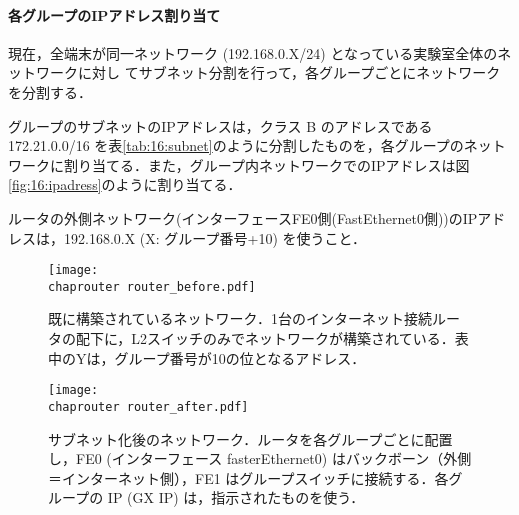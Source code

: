 \paragraph{各グループのIPアドレス割り当て}

現在，全端末が同一ネットワーク (192.168.0.X/24) となっている実験室全体のネットワークに対し
てサブネット分割を行って，各グループごとにネットワークを分割する．

グループのサブネットのIPアドレスは，クラス
B のアドレスである 172.21.0.0/16 を表\ref{tab:16:subnet}のように分割したものを，各グループのネットワークに割り当てる．また，グループ内ネットワークでのIPアドレスは図\ref{fig:16:ipadress}のように割り当てる．

ルータの外側ネットワーク(インターフェースFE0側(FastEthernet0側))のIPアドレスは，192.168.0.X (X: グループ番号+10) を使うこと．

\begin{figure}[tb]
\begin{center}
 \texttt{[image: \\chaprouter router\_before.pdf]}
 \caption{既に構築されているネットワーク．1台のインターネット接続ルータの配下に，L2スイッチのみでネットワークが構築されている．表中のYは，グループ番号が10の位となるアドレス．}
\end{center} 
\end{figure}

\begin{figure}[tb]
\begin{center}
 \texttt{[image: \\chaprouter router\_after.pdf]}
 \caption{サブネット化後のネットワーク．ルータを各グループごとに配置し，FE0 (インターフェース fasterEthernet0) はバックボーン（外側＝インターネット側），FE1 はグループスイッチに接続する．各グループの IP (GX IP) は，指示されたものを使う．}
\end{center} 
\end{figure}

